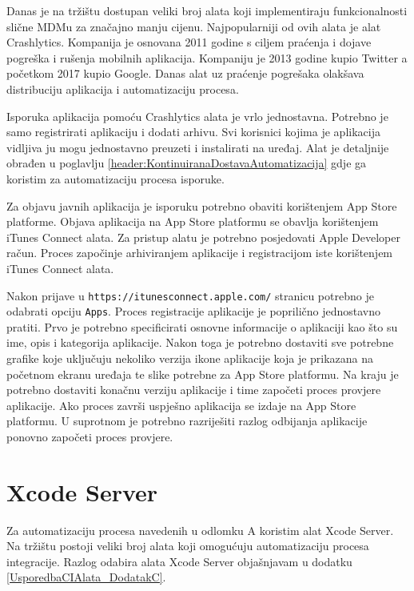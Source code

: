 \documentclass[times, utf8, diplomski, numeric]{fer}
\begin{document}
\begin{appendices}
Danas je na tržištu dostupan veliki broj alata koji implementiraju funkcionalnosti slične MDMu za značajno manju cijenu. Najpopularniji od ovih alata je alat Crashlytics. Kompanija je osnovana 2011 godine s ciljem praćenja i dojave pogreška i rušenja mobilnih aplikacija. Kompaniju je 2013 godine kupio Twitter a početkom 2017 kupio Google. Danas alat uz praćenje pogrešaka olakšava distribuciju aplikacija i automatizaciju procesa.

Isporuka aplikacija pomoću Crashlytics alata je vrlo jednostavna. Potrebno je samo registrirati aplikaciju i dodati arhivu. Svi korisnici kojima je aplikacija vidljiva ju mogu jednostavno preuzeti i instalirati na uređaj. Alat je detaljnije obrađen u poglavlju \ref{header:KontinuiranaDostavaAutomatizacija} gdje ga koristim za automatizaciju procesa isporuke.

Za objavu javnih aplikacija je isporuku potrebno obaviti korištenjem App Store platforme. Objava aplikacija na App Store platformu se obavlja korištenjem iTunes Connect alata. Za pristup alatu je potrebno posjedovati Apple Developer račun. Proces započinje arhiviranjem aplikacije i registracijom iste korištenjem iTunes Connect alata.

Nakon prijave u \verb|https://itunesconnect.apple.com/| stranicu potrebno je odabrati opciju \verb|Apps|. Proces registracije aplikacije je poprilično jednostavno pratiti. Prvo je potrebno specificirati osnovne informacije o aplikaciji kao što su ime, opis i kategorija aplikacije. Nakon toga je potrebno dostaviti sve potrebne grafike koje uključuju nekoliko verzija ikone aplikacije koja je prikazana na početnom ekranu uređaja te slike potrebne za App Store platformu. Na kraju je potrebno dostaviti konačnu verziju aplikacije i time započeti proces provjere aplikacije. Ako proces završi uspješno aplikacija se izdaje na App Store platformu. U suprotnom je potrebno razriješiti razlog odbijanja aplikacije ponovno započeti proces provjere.



\chapter{Xcode Server} \label{XcodeServer}

Za automatizaciju procesa navedenih u odlomku A koristim alat Xcode Server. Na tržištu postoji veliki broj alata koji omogućuju automatizaciju procesa integracije. Razlog odabira alata Xcode Server objašnjavam u dodatku \ref{UsporedbaCIAlata_DodatakC}.


\end{appendices}
\end{document}
